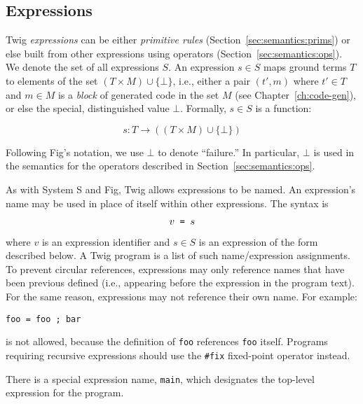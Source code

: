 
\subsection{Expressions}
\label{sec:expressions}

Twig \emph{expressions} can be either \emph{primitive rules}
(Section~\ref{sec:semantics:prims}) or else built from other
expressions using operators (Section~\ref{sec:semantics:ops}). We
denote the set of all expressions $S$. An expression $s \in S$
maps ground terms $T$ to elements of the set $(T \times M) \cup
\{\bot\}$, i.e., either a pair $(t',m)$ where $t' \in T$ and $m
\in M$ is a \emph{block} of generated code in the set $M$ (see
Chapter~\ref{ch:code-gen}), or else the special, distinguished
value $\bot$. Formally, $s \in S$ is a function:

\[
s : T \to ((T \times M) \cup \{\bot\})
\]

Following Fig's notation, we use $\bot$ to denote ``failure.'' In
particular, $\bot$ is used in the semantics for the operators
described in Section~\ref{sec:semantics:ops}.

As with System S and Fig, Twig allows expressions to be named. An
expression's name may be used in place of itself within other
expressions. The syntax is

\[
v \mbox{\texttt{ = }} s
\]

where $v$ is an expression identifier and $s \in S$ is an
expression of the form described below. A Twig program is a list
of such name/expression assignments. To prevent circular
references, expressions may only reference names that have been
previous defined (i.e., appearing before the expression in the
program text). For the same reason, expressions may not reference
their own name. For example:

\begin{verbatim}
foo = foo ; bar
\end{verbatim}

is not allowed, because the definition of \texttt{foo} references
\texttt{foo} itself. Programs requiring recursive expressions
should use the \texttt{\#fix} fixed-point operator instead.

There is a special expression name, \texttt{main}, which
designates the top-level expression for the program.
